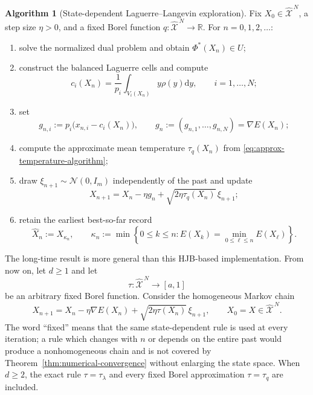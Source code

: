 \documentclass[11pt]{article}
\def\R{\mathbb{R}}
\def\Nc{{\mathcal N}}
\def\Xc{{\mathcal X}}
\def\hX{\widehat{\Xc}^{\,N}}
\newcommand{\dd}{\mathrm{d}}
\newcommand{\Record}{\widehat X}
\theoremstyle{definition}
\newtheorem{algorithm}[theorem]{Algorithm}
\theoremstyle{remark}
\numberwithin{equation}{section}
\begin{document}
\begin{algorithm}[State-dependent Laguerre--Langevin exploration]\label{alg:exploration}
Fix $X_0\in\hX$, a step size $\eta>0$, and a fixed Borel function
$q:\hX\to\R$.  For $n=0,1,2,\ldots$:
\begin{enumerate}[label=\textup{\arabic*.},leftmargin=2.4em]
\item solve the normalized dual problem and obtain $\Phi^*(X_n)\in U$;
\item construct the balanced Laguerre cells and compute
\[
 c_i(X_n)=\frac1{p_i}\int_{V_i(X_n)}y\rho(y)\dd y,
 \qquad i=1,\ldots,N;
\]
\item set
\[
 g_{n,i}:=p_i\bigl(x_{n,i}-c_i(X_n)\bigr),
 \qquad
 g_n:=(g_{n,1},\ldots,g_{n,N})=\nabla E(X_n);
\]
\item compute the approximate mean temperature $\tau_q(X_n)$ from
\eqref{eq:approx-temperature-algorithm};
\item draw $\xi_{n+1}\sim\Nc(0,I_m)$ independently of the past and update
\begin{equation}\label{eq:algorithm-update}
 X_{n+1}=X_n-\eta g_n+\sqrt{2\eta\tau_q(X_n)}\,\xi_{n+1};
\end{equation}
\item retain the earliest best-so-far record
\begin{equation}\label{eq:record-definition}
 \Record_n:=X_{\kappa_n},
 \qquad
 \kappa_n:=\min\left\{0\le k\le n:
 E(X_k)=\min_{0\le\ell\le n}E(X_\ell)\right\}.
\end{equation}
\end{enumerate}
\end{algorithm}

The long-time result is more general than this HJB-based implementation.  From now on, let
$d\ge1$ and let
\begin{equation}\label{eq:generic-temperature}
 \tau:\hX\longrightarrow[a,1]
\end{equation}
be an arbitrary fixed Borel function.  Consider the homogeneous Markov chain
\begin{equation}\label{eq:euler-generic}
 X_{n+1}
 =X_n-\eta\nabla E(X_n)
 +\sqrt{2\eta\tau(X_n)}\,\xi_{n+1},
 \qquad X_0=X\in\hX.
\end{equation}
The word ``fixed'' means that the same state-dependent rule is used at every iteration; a rule
which changes with $n$ or depends on the entire past would produce a nonhomogeneous chain and is
not covered by Theorem~\ref{thm:numerical-convergence} without enlarging the state space.  When
$d\ge2$, the exact rule $\tau=\tau_\lambda$ and every fixed Borel approximation $\tau=\tau_q$ are
included.
\end{document}
